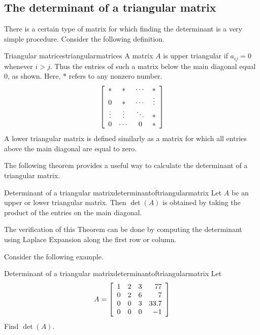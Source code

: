 \subsection{The determinant of a triangular matrix}

There is a certain type of matrix for which finding the determinant is
a very simple procedure. 
Consider the following definition. 

\begin{definition}{Triangular matrices}{triangularmatrices}
A matrix $A$ is upper triangular
 if $a_{ij}=0$ whenever $i>j$. Thus the entries of such a
matrix below the main diagonal equal $0$, 
as shown. Here, $\ast$ refers to any nonzero number. 
\begin{equation*}
\left[
\begin{array}{cccc}
\ast & \ast & \cdots & \ast \\
0 & \ast & \cdots & \vdots \\
\vdots & \vdots & \ddots & \ast \\
0 & \cdots & 0 & \ast
\end{array}
\right]
\end{equation*}
A lower triangular matrix is defined similarly as a matrix for which all
entries above the
main diagonal are equal to zero.
\end{definition}

The following theorem provides a useful way to calculate the determinant
of a triangular matrix. 

\begin{theorem}{Determinant of a triangular matrix}{determinantoftriangularmatrix}
Let $A$ be an upper or lower triangular matrix. Then $\det \left( A\right) $
is obtained by taking the product of the entries on the main diagonal.
\end{theorem}

The verification of this Theorem can be done by computing the
determinant using Laplace Expansion along the first row or column. 

Consider the following example. 

\begin{example}{Determinant of a triangular matrix}{determinantoftriangularmatrix}
Let
\begin{equation*}
A=\left[
\begin{array}{rrrr}
1 & 2 & 3 & 77 \\
0 & 2 & 6 & 7 \\
0 & 0 & 3 & 33.7 \\
0 & 0 & 0 & -1
\end{array}
\right]
\end{equation*}
Find $\det \left( A\right) .$
\end{example}

